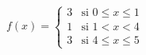 \item $f(x) = \begin{cases} 3 & \text{si } 0 \le x \le 1 \\ 1 & \text{si } 1 < x < 4 \\ 3 & \text{si } 4 \le x \le 5 \end{cases}$
